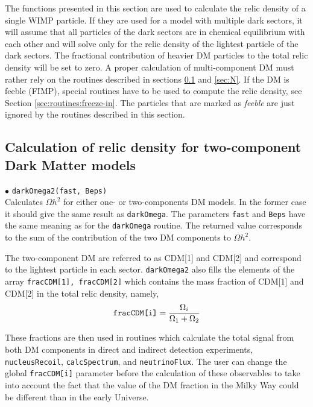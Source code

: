 \documentclass[12pt,a4paper]{article}
\begin{document}
The functions presented in this section are used to calculate the  relic density of a single WIMP
particle. If they are used for a model with multiple dark sectors, it will assume that all particles of the dark sectors are in chemical equilibrium with each other and will solve only for the relic density of the lightest  particle of the dark sectors. The fractional contribution of heavier  DM particles to the total relic density will be set to zero. A proper calculation of multi-component DM must rather rely on the routines described in sections \ref{sec:two} and \ref{sec:N}.  
If the DM is feeble (FIMP), special routines have to be used to compute the relic density, see Section \ref{sec:routines:freeze-in}. 
The particles that are marked as {\it
feeble} are just ignored by the  routines described in this section. 





\subsection{Calculation of relic density for  two-component Dark Matter models}
\label{sec:two}

$\bullet$ \verb|darkOmega2(fast, Beps)|\\
Calculates $\Omega h^2$ for either  one- or  two-components DM models. In the former case it should give the same result as \verb|darkOmega|.
The parameters {\tt fast} and {\tt Beps} have the same meaning as for the {\tt darkOmega} routine.
The returned value corresponds to the sum of the contribution of the two  DM components to  $\Omega h^2$.  


The two-component DM are  referred to as CDM[1] and CDM[2] and correspond to  the lightest particle in each sector. 
 \verb|darkOmega2| also fills the  elements of  the array {\tt fracCDM[1], fracCDM[2]} which contains the mass fraction
of CDM[1] and CDM[2] in the total relic density, namely,  
\begin{equation}
  \verb|fracCDM[i]|=\frac{\Omega_i}{ \Omega_1+\Omega_2}
\end{equation}


These fractions are   
  then used in routines which calculate the total signal from both  DM components  in direct and indirect detection experiments,
 \verb|nucleusRecoil|, \verb|calcSpectrum|,  and \verb|neutrinoFlux|.  The user can change the global {\tt  fracCDM[i]} parameter before the calculation of these observables
to take into account the fact that the value of the DM fraction in the Milky Way could be different than   in the early Universe.
\end{document}
